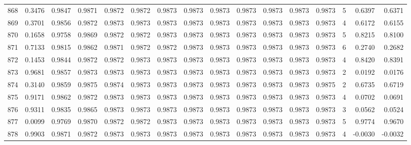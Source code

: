 \begin{tabular}{lrrrrrrrrrrrrrrr}
868 &      0.3476 &  0.9847 &  0.9871 &  0.9872 &  0.9872 &  0.9873 &  0.9873 &  0.9873 &  0.9873 &  0.9873 &   0.9873 &     0.9873 &      5 &                    0.6397 &                     0.6371 \\
869 &      0.3701 &  0.9856 &  0.9872 &  0.9873 &  0.9873 &  0.9873 &  0.9873 &  0.9873 &  0.9873 &  0.9873 &   0.9873 &     0.9873 &      4 &                    0.6172 &                     0.6155 \\
870 &      0.1658 &  0.9758 &  0.9869 &  0.9872 &  0.9872 &  0.9873 &  0.9873 &  0.9873 &  0.9873 &  0.9873 &   0.9873 &     0.9873 &      5 &                    0.8215 &                     0.8100 \\
871 &      0.7133 &  0.9815 &  0.9862 &  0.9871 &  0.9872 &  0.9872 &  0.9873 &  0.9873 &  0.9873 &  0.9873 &   0.9873 &     0.9873 &      6 &                    0.2740 &                     0.2682 \\
872 &      0.1453 &  0.9844 &  0.9872 &  0.9872 &  0.9873 &  0.9873 &  0.9873 &  0.9873 &  0.9873 &  0.9873 &   0.9873 &     0.9873 &      4 &                    0.8420 &                     0.8391 \\
873 &      0.9681 &  0.9857 &  0.9873 &  0.9873 &  0.9873 &  0.9873 &  0.9873 &  0.9873 &  0.9873 &  0.9873 &   0.9873 &     0.9873 &      2 &                    0.0192 &                     0.0176 \\
874 &      0.3140 &  0.9859 &  0.9875 &  0.9874 &  0.9873 &  0.9873 &  0.9873 &  0.9873 &  0.9873 &  0.9873 &   0.9873 &     0.9875 &      2 &                    0.6735 &                     0.6719 \\
875 &      0.9171 &  0.9862 &  0.9872 &  0.9873 &  0.9873 &  0.9873 &  0.9873 &  0.9873 &  0.9873 &  0.9873 &   0.9873 &     0.9873 &      4 &                    0.0702 &                     0.0691 \\
876 &      0.9311 &  0.9835 &  0.9865 &  0.9873 &  0.9873 &  0.9873 &  0.9873 &  0.9873 &  0.9873 &  0.9873 &   0.9873 &     0.9873 &      3 &                    0.0562 &                     0.0524 \\
877 &      0.0099 &  0.9769 &  0.9870 &  0.9872 &  0.9872 &  0.9873 &  0.9873 &  0.9873 &  0.9873 &  0.9873 &   0.9873 &     0.9873 &      5 &                    0.9774 &                     0.9670 \\
878 &      0.9903 &  0.9871 &  0.9872 &  0.9873 &  0.9873 &  0.9873 &  0.9873 &  0.9873 &  0.9873 &  0.9873 &   0.9873 &     0.9873 &      4 &                   -0.0030 &                    -0.0032 \\

\end{tabular}
